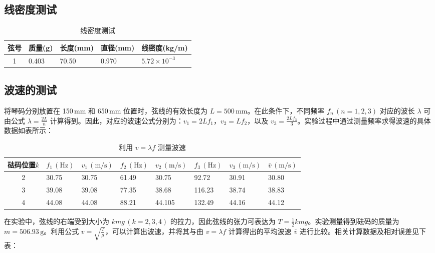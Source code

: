 \documentclass[UTF-8,twoside,cs4size]{ctexart}
\begin{document}
\subsection{线密度测试}
\begin{table}[!h]
    \centering
    \renewcommand\arraystretch{1.5}
    \caption{线密度测试}
    \begin{tabularx}{\textwidth}{|c|Y|Y|Y|Y|}
        \hline
        \textbf{弦号}&\textbf{质量}(g)&\textbf{长度}(mm)&\textbf{直径}(mm)&\textbf{线密度}(kg/m)\\
        &0.403&70.50&0.970&$5.72\times 10^{-3}$\\
        \hline
    \end{tabularx}
\end{table}

\subsection{波速的测试}
将琴码分别放置在 150\,mm 和 650\,mm 位置时，弦线的有效长度为 $L=500\,\mathrm{mm}$。在此条件下，不同频率 $f_n\,(n=1,2,3)$ 对应的波长 $\lambda$ 可由公式 $\lambda = \frac{2L}{n}$ 计算得到。因此，对应的波速公式分别为：$v_1 = 2Lf_1$，$v_2 = Lf_2$，以及 $v_3 = \frac{2Lf_3}{3}$。实验过程中通过测量频率求得波速的具体数据如表所示：

\begin{table}[!h]
    \centering
    \renewcommand\arraystretch{1.5}
    \caption{利用 $v = \lambda f$ 测量波速}
    \begin{tabularx}{\textwidth}{|c|Y|Y|Y|Y|Y|Y|Y|}
        \hline
        \textbf{砝码位置}$k$ & $f_1\,(\mathrm{Hz})$ & $v_1\,(\mathrm{m/s})$ & $f_2\,(\mathrm{Hz})$ & $v_2\,(\mathrm{m/s})$ & $f_3\,(\mathrm{Hz})$ & $v_3\,(\mathrm{m/s})$ & $\bar{v}\,(\mathrm{m/s})$ \\
         & 30.75 & 30.75 & 61.49 & 30.75 & 92.72 & 30.91 & 30.80 \\
         & 39.08 & 39.08 & 77.35 & 38.68 & 116.23 & 38.74 & 38.83 \\
         & 44.08 & 44.08 & 88.21 & 44.105 & 132.49 & 44.16 & 44.12 \\
        \hline
    \end{tabularx}
\end{table}

在实验中，弦线的右端受到大小为 $kmg\,(k=2,3,4)$ 的拉力，因此弦线的张力可表达为 $T = \frac{1}{2}kmg$。实验测量得到砝码的质量为 $m=506.93\,\mathrm{g}$。利用公式 $v = \sqrt{\frac{T}{\mu}}$，可以计算出波速，并将其与由 $v = \lambda f$ 计算得出的平均波速 $\bar{v}$ 进行比较。相关计算数据及相对误差见下表：
\end{document}

